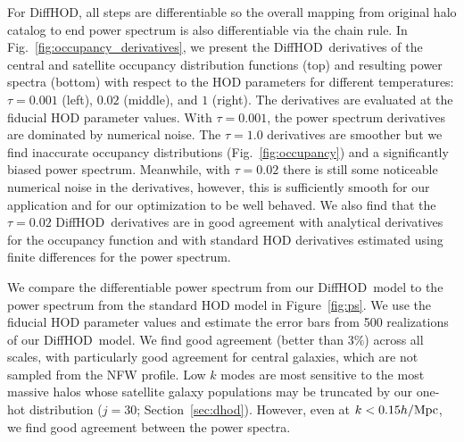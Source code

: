 \documentclass[a4paper,usenatbib]{mnras}
\newcommand{\FL}[1]{{\color{magenta}FL: #1}}
\newcommand{\CH}[1]{{\color{green}CH: #1}}
\newcommand{\CM}[1]{{\color{cyan}CM: #1}}
\newcommand{\dhod}{{\sc DiffHOD}}
\begin{document}
For \dhod, all steps are differentiable so the overall mapping from 
original halo catalog to end power spectrum is also differentiable via the
chain rule. 
In Fig.~\ref{fig:occupancy_derivatives}, we present the \dhod~derivatives 
of the central and satellite occupancy distribution functions (top)
and resulting power spectra (bottom) with respect to the HOD parameters
for different temperatures: $\tau = 0.001$ (left), $0.02$ (middle), and $1$ (right). 
The derivatives are evaluated at the fiducial HOD parameter values. 
With $\tau=0.001$, the power spectrum derivatives are dominated by numerical noise. 
The $\tau = 1.0$ derivatives are smoother but we find inaccurate occupancy
distributions (Fig.~\ref{fig:occupancy}) and a significantly biased power 
spectrum.
Meanwhile, with $\tau = 0.02$ there is still some noticeable numerical noise
in the derivatives, however, this is sufficiently smooth for our application 
and for our optimization to be well behaved. 
We also find that the $\tau=0.02$ \dhod~derivatives are in good agreement with
analytical derivatives for the occupancy function and with standard HOD derivatives 
estimated using finite differences for the power spectrum.


We compare the differentiable power spectrum from our \dhod~model to the power 
spectrum from the standard HOD model in Figure~\ref{fig:ps}.
We use the fiducial HOD parameter values and estimate the error bars from 500 
realizations of our \dhod~model. 
We find good agreement (better than $3\%$) across all scales, with particularly
good agreement for central galaxies, which are not sampled from the NFW profile. Low $k$ modes are most sensitive to the most massive halos whose satellite 
galaxy populations may be truncated by our one-hot distribution 
($j=30$; Section~\ref{sec:dhod}).
However, even at $k < 0.15 h/{\rm Mpc}$, we find good agreement between the power spectra.
    
\end{document}
